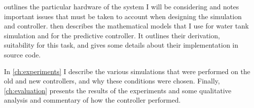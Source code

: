  outlines the particular hardware of the system I will be considering and notes important issues that must be taken to account when designing the simulation and controller.
 then describes the mathematical models that I use for water tank simulation and for the predictive controller.
It outlines their derivation, suitability for this task, and gives some details about their implementation in source code.

In \autoref{ch:experiments} I describe the various simulations that were performed on the old and new controllers, and why these conditions were chosen.
Finally, \autoref{ch:evaluation} presents the results of the experiments and some qualitative analysis and commentary of how the controller performed.
